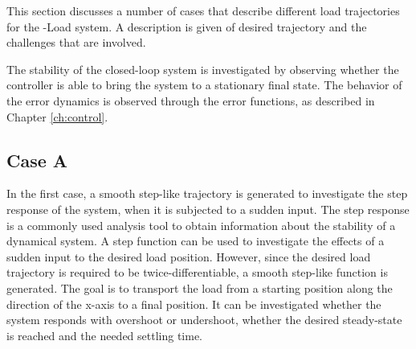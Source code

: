 
This section discusses a number of cases that describe different load trajectories for the -Load system.
A description is given of desired trajectory and the challenges that are involved.

The stability of the closed-loop system is investigated by observing whether the controller is able to bring the system to a stationary final state.
The behavior of the error dynamics is observed through the error functions, as described in Chapter \ref{ch:control}.

\subsection*{Case A}



In the first case, a smooth step-like trajectory is generated to investigate the step response of the system, when it is subjected to a sudden input.
The step response is a commonly used analysis tool to obtain information about the stability of a dynamical system.
A step function can be used to investigate the effects of a sudden input to the desired load position.
However, since the desired load trajectory is required to be twice-differentiable, a smooth step-like function is generated.
The goal is to transport the load from a starting position along the direction of the x-axis to a final position. 
It can be investigated whether the system responds with overshoot or undershoot, whether the desired steady-state is reached and the needed settling time.

